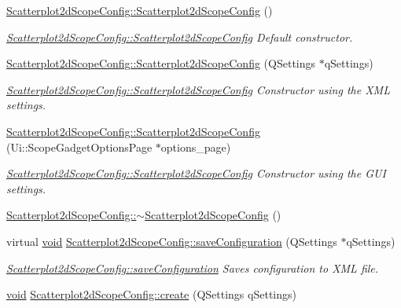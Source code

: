 \begin{DoxyCompactItemize}
\hyperlink{group___scope_plugin_gafdcf057f46ce7c284b969bf8d0a8fe0e}{\-Scatterplot2d\-Scope\-Config\-::\-Scatterplot2d\-Scope\-Config} ()
\begin{DoxyCompactList}\small\item\em \hyperlink{group___scope_plugin_gafdcf057f46ce7c284b969bf8d0a8fe0e}{\-Scatterplot2d\-Scope\-Config\-::\-Scatterplot2d\-Scope\-Config} \-Default constructor. \end{DoxyCompactList}\item 
\hyperlink{group___scope_plugin_ga3f0c68575d63ef6831f8e28d5835e056}{\-Scatterplot2d\-Scope\-Config\-::\-Scatterplot2d\-Scope\-Config} (\-Q\-Settings $\ast$q\-Settings)
\begin{DoxyCompactList}\small\item\em \hyperlink{group___scope_plugin_gafdcf057f46ce7c284b969bf8d0a8fe0e}{\-Scatterplot2d\-Scope\-Config\-::\-Scatterplot2d\-Scope\-Config} \-Constructor using the \-X\-M\-L settings. \end{DoxyCompactList}\item 
\hyperlink{group___scope_plugin_gab4f886463a61e05057f4fc3043b08f9e}{\-Scatterplot2d\-Scope\-Config\-::\-Scatterplot2d\-Scope\-Config} (\-Ui\-::\-Scope\-Gadget\-Options\-Page $\ast$options\-\_\-page)
\begin{DoxyCompactList}\small\item\em \hyperlink{group___scope_plugin_gafdcf057f46ce7c284b969bf8d0a8fe0e}{\-Scatterplot2d\-Scope\-Config\-::\-Scatterplot2d\-Scope\-Config} \-Constructor using the \-G\-U\-I settings. \end{DoxyCompactList}\item 
\hyperlink{group___scope_plugin_gad761d10c520b7bbeabfd1eac13b8d6d9}{\-Scatterplot2d\-Scope\-Config\-::$\sim$\-Scatterplot2d\-Scope\-Config} ()
\item 
virtual \hyperlink{group___u_a_v_objects_plugin_ga444cf2ff3f0ecbe028adce838d373f5c}{void} \hyperlink{group___scope_plugin_ga37a87c7a797180e5634b24238137d996}{\-Scatterplot2d\-Scope\-Config\-::save\-Configuration} (\-Q\-Settings $\ast$q\-Settings)
\begin{DoxyCompactList}\small\item\em \hyperlink{group___scope_plugin_ga37a87c7a797180e5634b24238137d996}{\-Scatterplot2d\-Scope\-Config\-::save\-Configuration} \-Saves configuration to \-X\-M\-L file. \end{DoxyCompactList}\item 
\hyperlink{group___u_a_v_objects_plugin_ga444cf2ff3f0ecbe028adce838d373f5c}{void} \hyperlink{group___scope_plugin_ga5b5afb4928f9ea75b7606be6a4138a3d}{\-Scatterplot2d\-Scope\-Config\-::create} (\-Q\-Settings q\-Settings)

\end{DoxyCompactItemize}
